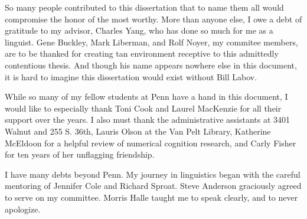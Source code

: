 So many people contributed to this dissertation that to name them all would compromise the honor of the most worthy. More than anyone else, I owe a debt of gratitude to my advisor, Charles Yang, who has done so much for me as a linguist. Gene Buckley, Mark Liberman, and Rolf Noyer, my commitee members, are to be thanked for creating tan environment receptive to this admittedly contentious thesis. And though his name appears nowhere else in this document, it is hard to imagine this dissertation would exist without Bill Labov.

While so many of my fellow students at Penn have a hand in this document, I would like to especially thank Toni Cook and Laurel MacKenzie for all their support over the years. I also must thank the administrative assistants at 3401 Walnut and 255 S. 36th, Lauris Olson at the Van Pelt Library, Katherine McEldoon for a helpful review of numerical cognition research, and Carly Fisher for ten years of her unflagging friendship.

I have many debts beyond Penn. My journey in linguistics began with the careful mentoring of Jennifer Cole and Richard Sproat. Steve Anderson graciously agreed to serve on my committee. Morris Halle taught me to speak clearly, and to never apologize.

